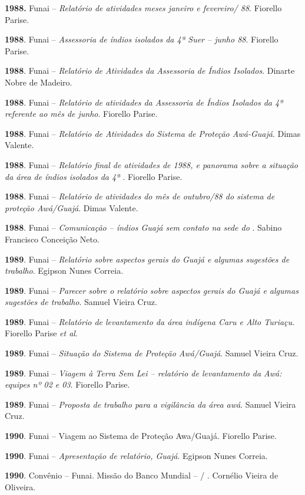 \begin{Parskip}
\textbf{1988.} Funai -- \emph{Relatório de atividades meses janeiro e
fevereiro/ 88}. Fiorello Parise.

\textbf{1988}. Funai -- \emph{Assessoria de índios isolados da 4ª Suer
-- junho 88}. Fiorello Parise.

\textbf{1988}. Funai -- \emph{Relatório de Atividades da Assessoria de
Índios Isolados}. Dinarte Nobre de Madeiro.

\textbf{1988}. Funai -- \emph{Relatório de atividades da Assessoria de
Índios Isolados da 4ª  referente ao mês de junho}. Fiorello Parise.

\textbf{1988}. Funai -- \emph{Relatório de Atividades do Sistema de
Proteção Awá-Guajá}. Dimas Valente.

\textbf{1988}. Funai -- \emph{Relatório final de atividades de 1988, e
panorama sobre a situação da área de índios isolados da 4ª }.
Fiorello Parise.

\textbf{1988}. Funai -- \emph{Relatório} \emph{de atividades do mês de
outubro/88 do sistema de proteção Awá/Guajá}. Dimas Valente.

\textbf{1988}. Funai -- \emph{Comunicação -- índios Guajá sem contato na
sede do }. Sabino Francisco Conceição Neto.

\textbf{1989}. Funai -- \emph{Relatório sobre aspectos gerais do 
Guajá e algumas sugestões de trabalho}. Egipson Nunes Correia.

\textbf{1989}. Funai -- \emph{Parecer sobre o relatório sobre aspectos
gerais do  Guajá e algumas sugestões de trabalho}. Samuel Vieira
Cruz.

\textbf{1989}. Funai -- \emph{Relatório de levantamento da área indígena
Caru e Alto Turiaçu.} Fiorello Parise \emph{et al}.

\textbf{1989}. Funai -- \emph{Situação do Sistema de Proteção
Awá/Guajá}. Samuel Vieira Cruz.

\textbf{1989}. Funai -- \emph{Viagem à Terra Sem Lei -- relatório de
levantamento da  Awá: equipes nº 02 e 03}. Fiorello Parise.

\textbf{1989}. Funai -- \emph{Proposta de trabalho para a vigilância da
área awá}. Samuel Vieira Cruz.

\textbf{1990}. Funai -- Viagem ao Sistema de Proteção Awa/Guajá.
Fiorello Parise.

\textbf{1990}. Funai -- \emph{Apresentação de relatório,  Guajá}.
Egipson Nunes Correia.

\textbf{1990}. Convênio  -- Funai. Missão do Banco Mundial -- /
. Cornélio Vieira de Oliveira.


\end{Parskip}
